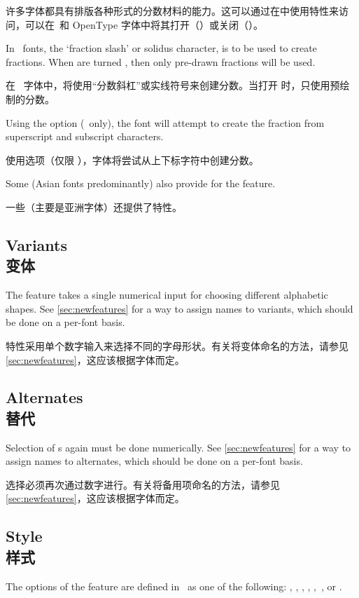 \documentclass[a4paper]{l3doc}
\begin{document}
许多字体都具有排版各种形式的分数材料的能力。这可以通过在中使用特性来访问，可以在\AAT\ 和 OpenType 字体中将其打开（）或关闭（）。


In \AAT\ fonts, the `fraction slash' or solidus character, is
to be used to create fractions. When  are turned
, then only pre-drawn fractions will be used.

在 \AAT\ 字体中，将使用“分数斜杠”或实线符号来创建分数。当打开 时，只使用预绘制的分数。

Using the  option (\AAT\ only), the font will attempt
to create the fraction from superscript and subscript
characters.

使用选项（仅限 \AAT ），字体将尝试从上下标字符中创建分数。

Some (Asian fonts predominantly) also provide for the
 feature.

一些（主要是亚洲字体）还提供了特性。

\subsection{Variants\\变体}
The  feature takes a single numerical input for
choosing different alphabetic shapes.
See \vref{sec:newfeatures} for a way to assign names to variants,
which should be done on a per-font basis.

特性采用单个数字输入来选择不同的字母形状。有关将变体命名的方法，请参见\vref{sec:newfeatures}，这应该根据字体而定。

\subsection{Alternates\\替代}
Selection of s again must be done numerically.
See \vref{sec:newfeatures} for a way to assign names to alternates,
which should be done on a per-font basis.

选择必须再次通过数字进行。有关将备用项命名的方法，请参见\vref{sec:newfeatures}，这应该根据字体而定。


\subsection{Style\\样式}
The options of the  feature
are defined in \AAT\ as one of the following: ,
, , ,
,\footnotemark\ , or .
\end{document}
